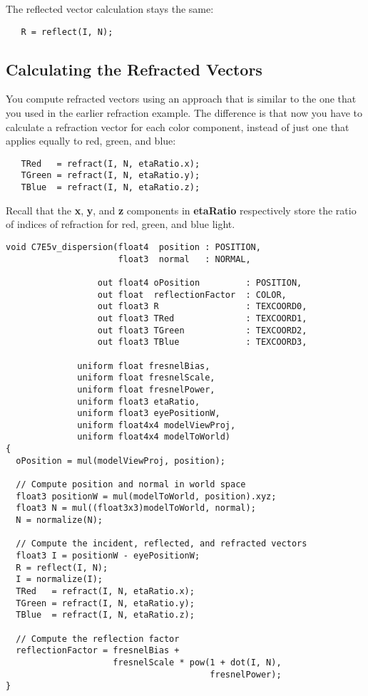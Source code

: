 \documentclass[../main.tex]{subfiles}
\begin{document}
The reflected vector calculation stays the same:

\FloatBarrier
\begin{lstlisting}
   R = reflect(I, N);
\end{lstlisting}
\FloatBarrier
   
\subsection*{Calculating the Refracted Vectors}

You compute refracted vectors using an approach that is similar to the one that you used in the earlier refraction example. The difference is that now you have to calculate a refraction vector for each color component, instead of just one that applies equally to red, green, and blue:

\FloatBarrier
\begin{lstlisting}
   TRed   = refract(I, N, etaRatio.x);
   TGreen = refract(I, N, etaRatio.y);
   TBlue  = refract(I, N, etaRatio.z);
\end{lstlisting}
\FloatBarrier
   
Recall that the \textbf{x}, \textbf{y}, and \textbf{z} components in \textbf{etaRatio} respectively store the ratio of indices of refraction for red, green, and blue light.

\FloatBarrier
\begin{lstlisting}[caption=Example 7-5. The \textbf{C7E5v_dispersion} Vertex Program]
void C7E5v_dispersion(float4  position : POSITION,
                      float3  normal   : NORMAL,

                  out float4 oPosition         : POSITION,
                  out float  reflectionFactor  : COLOR,
                  out float3 R                 : TEXCOORD0,
                  out float3 TRed              : TEXCOORD1,
                  out float3 TGreen            : TEXCOORD2,
                  out float3 TBlue             : TEXCOORD3,

              uniform float fresnelBias,
              uniform float fresnelScale,
              uniform float fresnelPower,
              uniform float3 etaRatio,
              uniform float3 eyePositionW,
              uniform float4x4 modelViewProj,
              uniform float4x4 modelToWorld)
{
  oPosition = mul(modelViewProj, position);

  // Compute position and normal in world space
  float3 positionW = mul(modelToWorld, position).xyz;
  float3 N = mul((float3x3)modelToWorld, normal);
  N = normalize(N);

  // Compute the incident, reflected, and refracted vectors
  float3 I = positionW - eyePositionW;
  R = reflect(I, N);
  I = normalize(I);
  TRed   = refract(I, N, etaRatio.x);
  TGreen = refract(I, N, etaRatio.y);
  TBlue  = refract(I, N, etaRatio.z);

  // Compute the reflection factor
  reflectionFactor = fresnelBias +
                     fresnelScale * pow(1 + dot(I, N),
                                        fresnelPower);
}
\end{lstlisting}
\FloatBarrier
\end{document}
